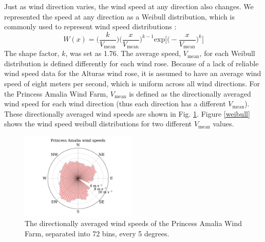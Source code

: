 Just as wind direction varies, the wind speed at any direction also changes. We represented the speed at any direction as a Weibull distribution, which is commonly used to represent wind speed distributions \citep{justus1978methods,rehman1994weibull,dorvlo2002estimating}: 
\begin{equation}
W(x) = \Big(\frac{k}{V_{\text{mean}}}\Big)\Big(\frac{x}{V_{\text{mean}}}\Big)^{k-1}\text{exp}\Big[\Big(-\frac{x}{V_{\text{mean}}}\Big)^k\Big]
\end{equation}
The shape factor, $k$, was set as 1.76. The average speed, $V_{\text{mean}}$, for each Weibull distribution is defined differently for each wind rose.
Because of a lack of reliable wind speed data for the Alturas wind rose, it is assumed to have an average wind speed of eight meters per second, which is uniform across all wind directions. For the Princess Amalia Wind Farm, $V_{\text{mean}}$ 
is defined as the directionally averaged wind speed for each wind direction (thus each direction has a different $V_{\text{mean}}$).
These directionally averaged wind speeds are shown in Fig. \ref{amalia_speeds}. Figure \ref{weibull} shows the wind speed weibull distributions for two different $V_{\text{mean}}$ values. 
\begin{figure}[htbp]
  \centering
  \includegraphics[width=0.49\textwidth]{Figures/amalia_speeds.pdf}
  \caption{\label{amalia_speeds} The directionally averaged wind speeds of the Princess Amalia Wind Farm, separated into 72 bins, every 5 degrees.}
\end{figure}

